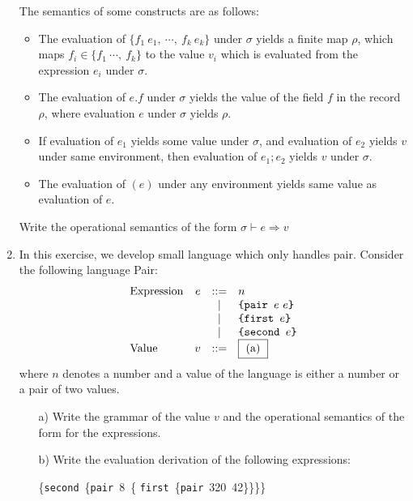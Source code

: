 \begin{enumerate}
The semantics of some constructs are as follows:
\begin{itemize}
  \item The evaluation of $\{f_1\ e_1,\ \cdots,\ f_k\ e_k\}$
    under $\sigma$ yields a finite map $\rho$,
which maps $f_i \in \{f_1\ \cdots,\ f_k\}$
to the value $v_i$ which is evaluated from the expression $e_i$ under $\sigma$.
  \item The evaluation of $e.f$ under $\sigma$ yields the value of the field $f$ in the record $\rho$,
      where evaluation $e$ under $\sigma$ yields $\rho$.
  \item If evaluation of $e_1$ yields some value under $\sigma$, and evaluation of $e_2$ yields $v$ under same environment,
      then evaluation of $e_1; e_2$ yields $v$ under $\sigma$.
\item The evaluation of $(e)$ under any environment yields same value as evaluation of $e$.
\end{itemize}

Write the operational semantics of the form
$\boxed{\sigma \vdash e \Rightarrow v}$

\item In this exercise, we develop small language which only handles pair. Consider the following language Pair:
\[
\begin{array}{lrcl}
\text{Expression}& e & ::= & n \\
&&\mid& \verb!{pair ! e\ e\verb+}+\\
&&\mid& \verb!{first ! e\verb+}+\\
&&\mid& \verb!{second ! e\verb+}+\\
\text{Value} & v & ::= & \fbox{ (a) }
\end{array}
\]
where $n$ denotes a number and a value of the language is either a number or a pair of two values.
\begin{itemize}
  \item[a)] Write the grammar of the value $v$ and
 the operational semantics of the form  for the expressions.
  \item[b)] Write the evaluation derivation of the following expressions:

\hspace*{-5em}
 \derive
{\hspace*{\textwidth}}
{\vdash
 \{\texttt{second}\ \{\texttt{pair}\ 8\ \{
 \texttt{first}\ \{\texttt{pair}\ 320\ 42\}\}\}\}
 \Rightarrow~~~~~~~~}
\end{itemize}


\end{enumerate}
